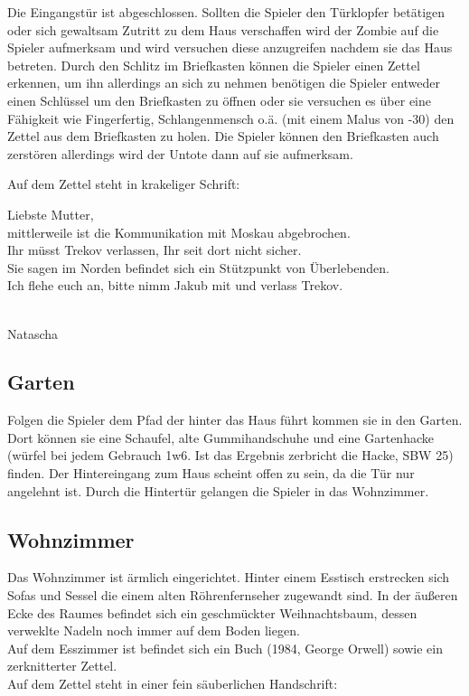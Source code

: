 Die Eingangstür ist abgeschlossen. Sollten die Spieler den Türklopfer betätigen oder sich gewaltsam Zutritt zu dem Haus verschaffen wird der Zombie auf die Spieler aufmerksam und wird versuchen diese anzugreifen nachdem sie das Haus betreten. Durch den Schlitz im Briefkasten können die Spieler einen Zettel erkennen, um ihn allerdings an sich zu nehmen benötigen die Spieler entweder einen Schlüssel um den Briefkasten zu öffnen oder sie versuchen es über eine Fähigkeit wie Fingerfertig, Schlangenmensch o.ä. (mit einem Malus von -30) den Zettel aus dem Briefkasten zu holen. Die Spieler können den Briefkasten auch zerstören allerdings wird der Untote dann auf sie aufmerksam.

\newpage
Auf dem Zettel steht in krakeliger Schrift:

\begin{itshape}
	Liebste Mutter,
	\\mittlerweile ist die Kommunikation mit Moskau abgebrochen.
	\\Ihr müsst Trekov verlassen, Ihr seit dort nicht sicher.
	\\Sie sagen im Norden befindet sich ein Stützpunkt von Überlebenden.
	\\Ich flehe euch an, bitte nimm Jakub mit und verlass Trekov.

	\\Natascha

\end{itshape}

\subsection{Garten}

Folgen die Spieler dem Pfad der hinter das Haus führt kommen sie in den Garten. Dort können sie eine Schaufel, alte Gummihandschuhe und eine Gartenhacke (würfel bei jedem Gebrauch 1w6. Ist das Ergebnis  zerbricht die Hacke, SBW 25) finden. Der Hintereingang zum Haus scheint offen zu sein, da die Tür nur angelehnt ist. Durch die Hintertür gelangen die Spieler in das Wohnzimmer.

\subsection{Wohnzimmer}

Das Wohnzimmer ist ärmlich eingerichtet. Hinter einem Esstisch erstrecken sich Sofas und Sessel die einem alten Röhrenfernseher zugewandt sind. In der äußeren Ecke des Raumes befindet sich ein geschmückter Weihnachtsbaum, dessen verweklte Nadeln noch immer auf dem Boden liegen.
\\Auf dem Esszimmer ist befindet sich ein Buch (1984, George Orwell) sowie ein zerknitterter Zettel.
\\Auf dem Zettel steht in einer fein säuberlichen Handschrift:

